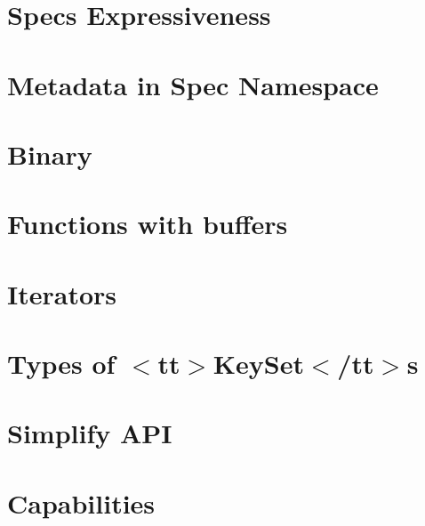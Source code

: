 \let\mypdfximage\pdfximage\def\pdfximage{\immediate\mypdfximage}\documentclass[twoside]{book}
\newcommand{\+}{\discretionary{\mbox{\scriptsize$\hookleftarrow$}}{}{}}
\begin{document}
\chapter{Spec\textquotesingle{}s Expressiveness}
\label{doc_decisions_1_problem_clear_spec_expressiveness_md}

\chapter{Metadata in Spec Namespace}
\label{doc_decisions_1_problem_clear_spec_metadata_md}

\chapter{Binary}
\label{doc_decisions_2_solutions_clear_binary_md}

\chapter{Functions with buffers}
\label{doc_decisions_2_solutions_clear_functions_with_buffers_md}

\chapter{Iterators}
\label{doc_decisions_2_solutions_clear_iterators_md}

\chapter{Types of $<$tt$>$Key\+Set$<$/tt$>$s}
\label{doc_decisions_2_solutions_clear_keyset_types_md}

\chapter{Simplify API}
\label{doc_decisions_2_solutions_clear_simplify_api_md}

\chapter{Capabilities}
\label{doc_decisions_4_decided_capabilities_md}

\end{document}
